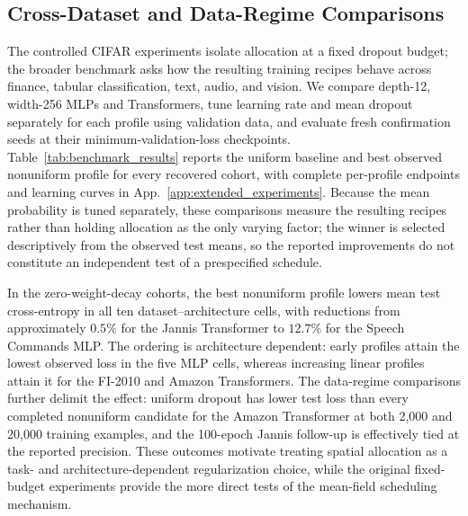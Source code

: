 \subsection{Cross-Dataset and Data-Regime Comparisons}
\label{sec:extended_benchmarks}

The controlled CIFAR experiments isolate allocation at a fixed dropout budget; the broader benchmark asks how the resulting training recipes behave across finance, tabular classification, text, audio, and vision. We compare depth-12, width-256 MLPs and Transformers, tune learning rate and mean dropout separately for each profile using validation data, and evaluate fresh confirmation seeds at their minimum-validation-loss checkpoints. Table~\ref{tab:benchmark_results} reports the uniform baseline and best observed nonuniform profile for every recovered cohort, with complete per-profile endpoints and learning curves in App.~\ref{app:extended_experiments}. Because the mean probability is tuned separately, these comparisons measure the resulting recipes rather than holding allocation as the only varying factor; the winner is selected descriptively from the observed test means, so the reported improvements do not constitute an independent test of a prespecified schedule.

In the zero-weight-decay cohorts, the best nonuniform profile lowers mean test cross-entropy in all ten dataset--architecture cells, with reductions from approximately $0.5\%$ for the Jannis Transformer to $12.7\%$ for the Speech Commands MLP. The ordering is architecture dependent: early profiles attain the lowest observed loss in the five MLP cells, whereas increasing linear profiles attain it for the FI-2010 and Amazon Transformers. The data-regime comparisons further delimit the effect: uniform dropout has lower test loss than every completed nonuniform candidate for the Amazon Transformer at both 2,000 and 20,000 training examples, and the 100-epoch Jannis follow-up is effectively tied at the reported precision. These outcomes motivate treating spatial allocation as a task- and architecture-dependent regularization choice, while the original fixed-budget experiments provide the more direct tests of the mean-field scheduling mechanism.
